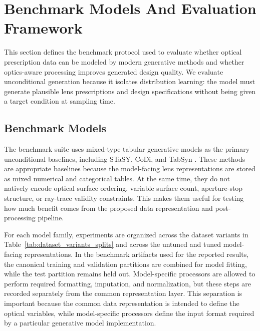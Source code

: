 \section{Benchmark Models And Evaluation Framework}
\label{sec:benchmark_models_evaluation}

This section defines the benchmark protocol used to evaluate whether optical prescription data can be modeled by modern generative methods and whether optics-aware processing improves generated design quality. We evaluate unconditional generation because it isolates distribution learning: the model must generate plausible lens prescriptions and design specifications without being given a target condition at sampling time.

\subsection{Benchmark Models}\label{subsec:off_shelf_uncond_gen}

The benchmark suite uses mixed-type tabular generative models as the primary unconditional baselines, including STaSY, CoDi, and TabSyn \cite{Kim2023STaSy,Lee2023CoDi,Zhang2024TabSyn}. These methods are appropriate baselines because the model-facing lens representations are stored as mixed numerical and categorical tables. At the same time, they do not natively encode optical surface ordering, variable surface count, aperture-stop structure, or ray-trace validity constraints. This makes them useful for testing how much benefit comes from the proposed data representation and post-processing pipeline.

For each model family, experiments are organized across the dataset variants in Table~\ref{tab:dataset_variants_splits} and across the untuned and tuned model-facing representations. In the benchmark artifacts used for the reported results, the canonical training and validation partitions are combined for model fitting, while the test partition remains held out. Model-specific processors are allowed to perform required formatting, imputation, and normalization, but these steps are recorded separately from the common representation layer. This separation is important because the common data representation is intended to define the optical variables, while model-specific processors define the input format required by a particular generative model implementation.

